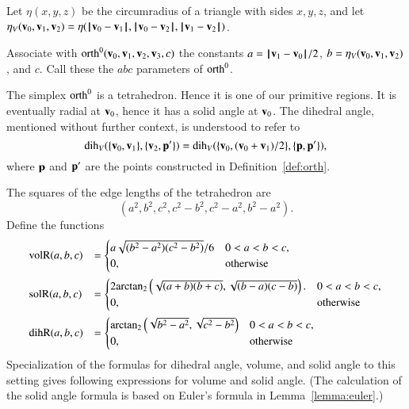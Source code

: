 \begin{definition}\label{def:etaV}
Let $\eta(x,y,z)$ be the circumradius of a triangle with sides
$x,y,z$, and let $\eta_V({\mathbf v}_0,{\mathbf v}_1,{\mathbf v}_2) = \eta({\hskip0.1em|\hskip-0.15em|\hskip0.1em}{\mathbf v}_0 - {\mathbf v}_1{\hskip0.1em|\hskip-0.15em|\hskip0.1em},{\hskip0.1em|\hskip-0.15em|\hskip0.1em}{\mathbf v}_0 - {\mathbf v}_2{\hskip0.1em|\hskip-0.15em|\hskip0.1em},{\hskip0.1em|\hskip-0.15em|\hskip0.1em}{\mathbf v}_1 - {\mathbf v}_2{\hskip0.1em|\hskip-0.15em|\hskip0.1em})$.
%
%
%
\end{definition}

\begin{definition}
Associate with ${\operatorname{orth}}^0({\mathbf v}_0,{\mathbf v}_1,{\mathbf v}_2,{\mathbf v}_3,c)$ the constants
$a={\hskip0.1em|\hskip-0.15em|\hskip0.1em}{\mathbf v}_1 - {\mathbf v}_0{\hskip0.1em|\hskip-0.15em|\hskip0.1em}/2$, $b=\eta_V({\mathbf v}_0,{\mathbf v}_1,{\mathbf v}_2)$, and $c$.
Call these the $abc$ parameters of ${\operatorname{orth}}^0$.
%
%
%
\end{definition}

The simplex ${\operatorname{orth}}^0$ is a tetrahedron.  Hence it is one of our
primitive regions.  It is eventually radial at ${\mathbf v}_0$, hence
it has a solid angle at ${\mathbf v}_0$.  The dihedral
angle, mentioned without further context, is understood to refer to 
   $$
   \operatorname{dih}_V(\{{\mathbf v}_0,{\mathbf v}_1\},\{{\mathbf v}_2,{\mathbf p}'\})=\operatorname{dih}_V(\{{\mathbf v}_0,({\mathbf v}_0+{\mathbf v}_1)/2\},\{{\mathbf p},{\mathbf p}'\}),
   $$
%
where ${\mathbf p}$ and ${\mathbf p}'$ are the points 
constructed in Definition~\ref{def:orth}.

The squares of the edge lengths of the tetrahedron are
   $$
   (a^2,b^2,c^2,c^2-b^2,c^2-a^2,b^2-a^2).
   $$
Define the functions
   $$
   \begin{array}{lll}
     \op{volR}(a,b,c) &= \begin{cases}
       a\sqrt{(b^2-a^2)(c^2-b^2)}/6& 0 < a < b < c,\\
       0,&\text{otherwise}
       \end{cases}\vspace{6pt}\\
     \op{solR}(a,b,c) &= \begin{cases}
      2 \atn\left(\sqrt{{(a+b)(b+c)}},
         \sqrt{{(b-a) (c-b)}}\right).& 0 < a < b < c,\\
      0,&\text{otherwise}
     \end{cases} \vspace{6pt}\\
     \op{dihR}(a,b,c) &= \begin{cases}
      \atn\left(\sqrt{b^2 - a^2},\sqrt{c^2 - b^2}\right)
      & 0 < a < b < c,\\
      0,&\text{otherwise}
     \end{cases}
     \end{array}
   $$
%
%
%
Specialization of the formulas for dihedral angle, volume, and solid angle to this
setting gives following expressions for volume and solid angle.
(The calculation of the
 solid angle formula is based on Euler's formula in 
Lemma~\ref{lemma:euler}.)

